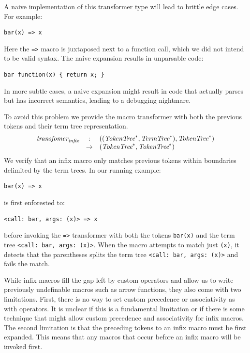 \documentclass[preprint,10pt]{sigplanconf}
\begin{document}
A naive implementation of this transformer type will lead to brittle
edge cases. For example:
\begin{lstlisting}
bar(x) => x
\end{lstlisting}
Here the \verb!=>! macro is juxtaposed next to a function call,
which we did not intend to be valid syntax. The naive expansion results
in unparsable code:
\begin{lstlisting}
bar function(x) { return x; }
\end{lstlisting}

In more subtle cases, a naive expansion might result in code that
actually parses but has incorrect semantics, leading to a
debugging nightmare.

To avoid this problem we provide the macro transformer with both the
previous tokens and their term tree representation.
\[
\begin{array}{rcl}
  \textit{transfomer}_{\textit{infix}} &:& ((\textit{TokenTree}^*, \textit{TermTree}^{*}), \textit{TokenTree}^*) 
  \\
  &\rightarrow& (\textit{TokenTree}^*, \textit{TokenTree}^*)
\end{array}
\]
We verify that an infix macro only
matches previous tokens within boundaries delimited by 
the term trees. In our running example:
\begin{lstlisting}
bar(x) => x
\end{lstlisting}
is first enforested to:
\begin{lstlisting}
<call: bar, args: (x)> => x
\end{lstlisting}
before invoking the \verb!=>! transformer with both the tokens
\verb!bar(x)! and the term tree
\verb!<call: bar, args: (x)>!. When the macro attempts to match
just \verb!(x)!, it detects that the parentheses splits the term
tree \verb!<call: bar, args: (x)>! and fails the match.

While infix macros fill the gap left by custom operators and allow
us to write previously undefinable macros such as arrow functions,
they also come with two limitations. First, there is no way to set
custom precedence or associativity as with operators. It is unclear
if this is a fundamental limitation or if there is some technique that
might allow custom precedence and associativity for infix macros.
The second limitation is that the preceding tokens to an infix macro
must be first expanded. This means that any macros that occur before
an infix macro will be invoked first.
\end{document}
